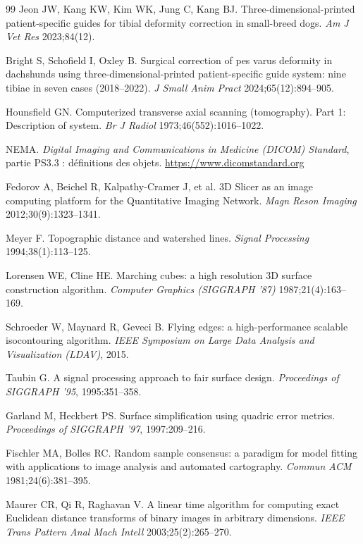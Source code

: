 \begin{thebibliography}{99}
 Jeon JW, Kang KW, Kim WK, Jung C, Kang BJ. Three-dimensional-printed patient-specific guides for
tibial deformity correction in small-breed dogs. \emph{Am J Vet Res} 2023;84(12). 

 Bright S, Schofield I, Oxley B. Surgical correction of pes varus deformity in dachshunds using
three-dimensional-printed patient-specific guide system: nine tibiae in seven cases (2018--2022). \emph{J Small Anim
Pract} 2024;65(12):894--905. 

 Hounsfield GN. Computerized transverse axial scanning (tomography). Part 1: Description of
system. \emph{Br J Radiol} 1973;46(552):1016--1022.

 NEMA. \emph{Digital Imaging and Communications in Medicine (DICOM) Standard}, partie PS3.3 :
définitions des objets. \url{https://www.dicomstandard.org}

 Fedorov A, Beichel R, Kalpathy-Cramer J, et al. 3D Slicer as an image computing platform for
the Quantitative Imaging Network. \emph{Magn Reson Imaging} 2012;30(9):1323--1341.

 Meyer F. Topographic distance and watershed lines. \emph{Signal Processing} 1994;38(1):113--125.

 Lorensen WE, Cline HE. Marching cubes: a high resolution 3D surface construction algorithm.
\emph{Computer Graphics (SIGGRAPH '87)} 1987;21(4):163--169.

 Schroeder W, Maynard R, Geveci B. Flying edges: a high-performance scalable isocontouring
algorithm. \emph{IEEE Symposium on Large Data Analysis and Visualization (LDAV)}, 2015.

 Taubin G. A signal processing approach to fair surface design. \emph{Proceedings of SIGGRAPH
'95}, 1995:351--358.

 Garland M, Heckbert PS. Surface simplification using quadric error metrics. \emph{Proceedings of
SIGGRAPH '97}, 1997:209--216.

 Fischler MA, Bolles RC. Random sample consensus: a paradigm for model fitting with applications
to image analysis and automated cartography. \emph{Commun ACM} 1981;24(6):381--395.

 Maurer CR, Qi R, Raghavan V. A linear time algorithm for computing exact Euclidean distance
transforms of binary images in arbitrary dimensions. \emph{IEEE Trans Pattern Anal Mach Intell} 2003;25(2):265--270.


\end{thebibliography}
